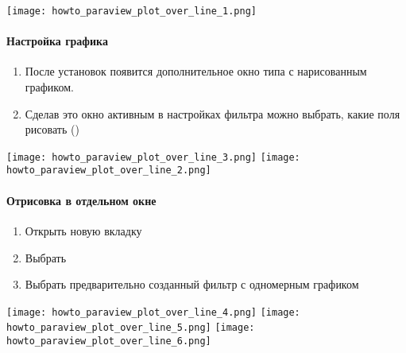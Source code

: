 \begin{center}
\texttt{[image: howto\_paraview\_plot\_over\_line\_1.png]}
\end{center}

\paragraph{Настройка графика}
\begin{enumerate}
\item
После установок появится дополнительное окно типа  с нарисованным графиком.
\item
Сделав это окно активным в настройках фильтра 
можно выбрать, какие поля рисовать ()
\end{enumerate}

\begin{center}
\texttt{[image: howto\_paraview\_plot\_over\_line\_3.png]}
\quad
\texttt{[image: howto\_paraview\_plot\_over\_line\_2.png]}
\end{center}

\paragraph{Отрисовка в отдельном окне}
\begin{enumerate}
\item
Открыть новую вкладку
\item
Выбрать 
\item
Выбрать предварительно созданный фильтр с одномерным графиком
\end{enumerate}
\begin{center}
\texttt{[image: howto\_paraview\_plot\_over\_line\_4.png]}
\quad
\texttt{[image: howto\_paraview\_plot\_over\_line\_5.png]}
\quad
\texttt{[image: howto\_paraview\_plot\_over\_line\_6.png]}
\end{center}
